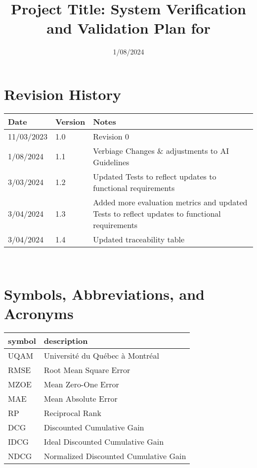\documentclass[12pt, titlepage]{article}
\begin{document}
\title{Project Title: System Verification and Validation Plan for \progname{}} 
\author{\authname}
\date{1/08/2024}
	
\maketitle


\section*{Revision History}

\begin{tabularx}{\textwidth}{p{3cm}p{2cm}X}
\toprule {\bf Date} & {\bf Version} & {\bf Notes}\\
\midrule
11/03/2023 & 1.0 & Revision 0\\
1/08/2024 & 1.1 & Verbiage Changes \& adjustments to AI Guidelines \\
3/03/2024 & 1.2 & Updated Tests to reflect updates to functional requirements \\
3/04/2024 & 1.3 & Added more evaluation metrics and updated Tests to reflect updates to functional requirements \\
3/04/2024 & 1.4 & Updated traceability table \\
\bottomrule
\end{tabularx}

~\\

\newpage

\tableofcontents

\listoftables

\newpage

\section{Symbols, Abbreviations, and Acronyms}

\renewcommand{\arraystretch}{1.2}
\begin{tabular}{l l} 
  \toprule		
  \textbf{symbol} & \textbf{description}\\
  \midrule 
  UQAM & Université du Québec à Montréal\\
  RMSE & Root Mean Square Error\\
  MZOE & Mean Zero-One Error\\
  MAE & Mean Absolute Error\\
  RP & Reciprocal Rank\\
  DCG & Discounted Cumulative Gain\\
  IDCG & Ideal Discounted Cumulative Gain\\
  NDCG & Normalized Discounted Cumulative Gain\\
  \bottomrule
\end{tabular}\\
\end{document}
